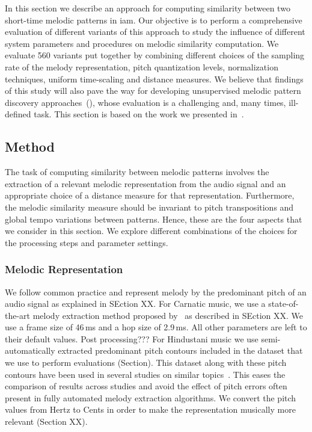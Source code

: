 In this section we describe an approach for computing similarity between two short-time melodic patterns in \gls{iam}. Our objective is to perform a comprehensive evaluation of different variants of this approach to study the influence of different system parameters and procedures on melodic similarity computation. We evaluate 560 variants put together by combining different choices of the sampling rate of the melody representation, pitch quantization levels, normalization techniques, uniform time-scaling and distance measures. We believe that findings of this study will also pave the way for developing unsupervised melodic pattern discovery approaches~(), whose evaluation is a challenging and, many times, ill-defined task. This section is based on the work we presented in~\cite{gulati_ICASSP2015}.

\subsection{Method}
The task of computing similarity between melodic patterns involves the extraction of a relevant melodic representation from the audio signal and an appropriate choice of a distance measure for that representation. Furthermore, the melodic similarity measure should be invariant to pitch transpositions and global tempo variations between patterns. Hence, these are the four aspects that we consider in this section. We explore different combinations of the choices for the processing steps and parameter settings.


\subsubsection{Melodic Representation}
\label{sec:patterns_melodic_similarity_representation}

We follow common practice and represent melody by the predominant pitch of an audio signal as explained in SEction XX. For Carnatic music, we use a state-of-the-art melody extraction method proposed by~\cite{Salamon2012} as described in SEction XX. We use a frame size of 46\,ms and a hop size of 2.9\,ms. All other parameters are left to their default values. Post processing??? For Hindustani music we use semi-automatically extracted predominant pitch contours included in the dataset that we use to perform evaluations (Section). This dataset along with these pitch contours have been used in several studies on similar topics~\citep{Rao2014, Ross2012b, Ross2012}. This eases the comparison of results across studies and avoid the effect of pitch errors often present in fully automated melody extraction algorithms. We convert the pitch values from Hertz to Cents in order to make the representation musically more relevant (Section XX).

